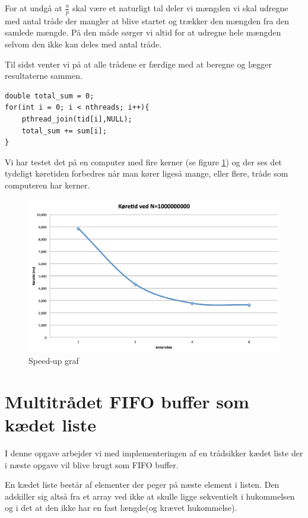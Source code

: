 \documentclass[danish]{report}
\begin{document}
For at undgå at $\frac{n}{p}$ skal være et naturligt tal deler vi mængden vi skal udregne med antal tråde der mangler at blive startet og trækker den mængden fra den samlede mængde. På den måde sørger vi altid for at udregne hele mængden selvom den ikke kan deles med antal tråde. 

Til sidst venter vi på at alle trådene er færdige med at beregne og lægger resultaterne sammen.

\begin{lstlisting}    
double total_sum = 0;
for(int i = 0; i < nthreads; i++){
    pthread_join(tid[i],NULL);
    total_sum += sum[i];
}
\end{lstlisting}

Vi har testet det på en computer med fire kerner (se figure \ref{fig:3}) og der ses det tydeligt køretiden forbedres når man kører ligeså mange, eller flere, tråde som computeren har kerner.

\begin{figure}[H]
\includegraphics[width=\linewidth]{img/3.png}
\caption{Speed-up graf}
\label{fig:3}
\end{figure}

\chapter{Multitrådet FIFO buffer som kædet liste}
I denne opgave arbejder vi med implementeringen af en trådsikker kædet liste der i næste opgave vil blive brugt som FIFO buffer.

En kædet liste består af elementer der peger på næste element i listen. Den adskiller sig altså fra et array ved ikke at skulle ligge sekventielt i hukommelsen og i det at den ikke har en fast længde(og krævet hukommelse).
\end{document}
